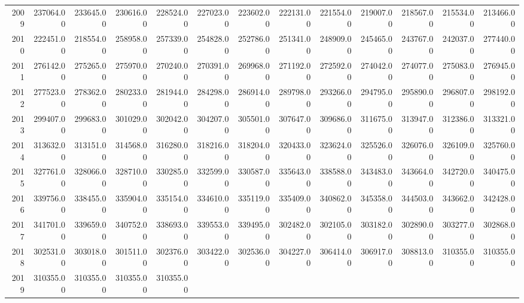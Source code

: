 \begin{longtable}{rrrrrrrrrrrrr}
  2009 & 237064.00 & 233645.00 & 230616.00 & 228524.00 & 227023.00 & 223602.00 & 222131.00 & 221554.00 & 219007.00 & 218567.00 & 215534.00 & 213466.00 \\ 
  2010 & 222451.00 & 218554.00 & 258958.00 & 257339.00 & 254828.00 & 252786.00 & 251341.00 & 248909.00 & 245465.00 & 243767.00 & 242037.00 & 277440.00 \\ 
  2011 & 276142.00 & 275265.00 & 275970.00 & 270240.00 & 270391.00 & 269968.00 & 271192.00 & 272592.00 & 274042.00 & 274077.00 & 275083.00 & 276945.00 \\ 
  2012 & 277523.00 & 278362.00 & 280233.00 & 281944.00 & 284298.00 & 286914.00 & 289798.00 & 293266.00 & 294795.00 & 295890.00 & 296807.00 & 298192.00 \\ 
  2013 & 299407.00 & 299683.00 & 301029.00 & 302042.00 & 304207.00 & 305501.00 & 307647.00 & 309686.00 & 311675.00 & 313947.00 & 312386.00 & 313321.00 \\ 
  2014 & 313632.00 & 313151.00 & 314568.00 & 316280.00 & 318216.00 & 318204.00 & 320433.00 & 323624.00 & 325526.00 & 326076.00 & 326109.00 & 325760.00 \\ 
  2015 & 327761.00 & 328066.00 & 328710.00 & 330285.00 & 332599.00 & 330587.00 & 335643.00 & 338588.00 & 343483.00 & 343664.00 & 342720.00 & 340475.00 \\ 
  2016 & 339756.00 & 338455.00 & 335904.00 & 335154.00 & 334610.00 & 335119.00 & 335409.00 & 340862.00 & 345358.00 & 344503.00 & 343662.00 & 342428.00 \\ 
  2017 & 341701.00 & 339659.00 & 340752.00 & 338693.00 & 339553.00 & 339495.00 & 302482.00 & 302105.00 & 303182.00 & 302890.00 & 303277.00 & 302868.00 \\ 
  2018 & 302531.00 & 303018.00 & 301511.00 & 302376.00 & 303422.00 & 302536.00 & 304227.00 & 306414.00 & 306917.00 & 308813.00 & 310355.00 & 310355.00 \\ 
  2019 & 310355.00 & 310355.00 & 310355.00 & 310355.00 &  &  &  &  &  &  &  &  \\ 
   \hline
\hline
\end{longtable}
